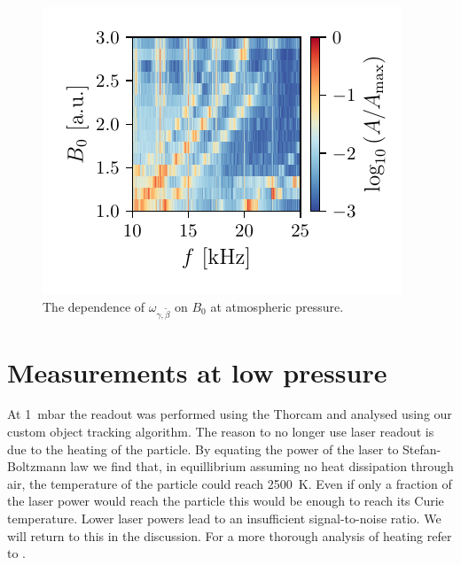 \begin{figure}
    \centering
    \includegraphics{figures/data/rotational_mode_dependence_on_B0.pdf}
    \caption{The dependence of $\omega_{\gamma,\tilde\beta}$ on $B_0$ at atmospheric pressure.}
    \label{fig:rotational-mode-dependence-1bar}
\end{figure}

\section{Measurements at low pressure}
\label{sec:measurements-at-low-pressure}
At \qty{1}{\milli\bar} the readout was performed using the Thorcam and analysed using our custom object tracking algorithm. The reason to no longer use laser readout is due to the heating of the particle. By equating the power of the laser to Stefan-Boltzmann law we find that, in equillibrium assuming no heat dissipation through air, the temperature of the particle could reach \qty{2500}{\kelvin}. Even if only a fraction of the laser power would reach the particle this would be enough to reach its Curie temperature. Lower laser powers lead to an insufficient signal-to-noise ratio. We will return to this in the discussion. For a more thorough analysis of heating refer to \cite{millen}.

